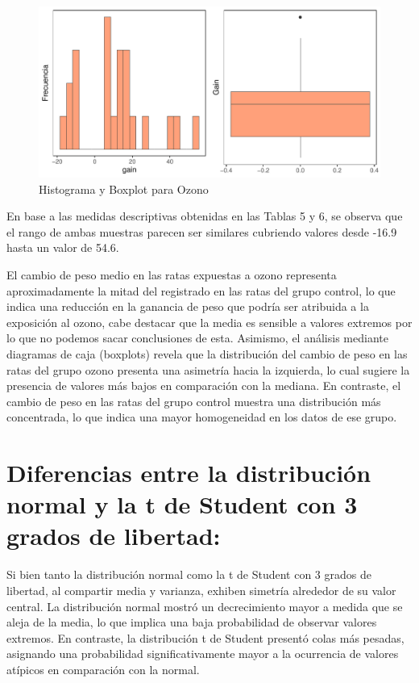 \documentclass[
]{article}
\begin{document}
\begin{figure}

{\centering \includegraphics{TP-2---El-Dibu-de-la-vida_files/figure-latex/f17-1} 

}

\caption{Histograma y Boxplot para Ozono}\label{fig:f17}
\end{figure}

En base a las medidas descriptivas obtenidas en las Tablas 5 y 6, se observa que el rango de ambas muestras parecen ser similares cubriendo valores desde -16.9 hasta un valor de 54.6.

El cambio de peso medio en las ratas expuestas a ozono representa aproximadamente la mitad del registrado en las ratas del grupo control, lo que indica una reducción en la ganancia de peso que podría ser atribuida a la exposición al ozono, cabe destacar que la media es sensible a valores extremos por lo que no podemos sacar conclusiones de esta. Asimismo, el análisis mediante diagramas de caja (boxplots) revela que la distribución del cambio de peso en las ratas del grupo ozono presenta una asimetría hacia la izquierda, lo cual sugiere la presencia de valores más bajos en comparación con la mediana. En contraste, el cambio de peso en las ratas del grupo control muestra una distribución más concentrada, lo que indica una mayor homogeneidad en los datos de ese grupo.

\newpage

\section{Diferencias entre la distribución normal y la t de Student con 3 grados de libertad:}\label{diferencias-entre-la-distribuciuxf3n-normal-y-la-t-de-student-con-3-grados-de-libertad}

Si bien tanto la distribución normal como la t de Student con 3 grados de libertad, al compartir media y varianza, exhiben simetría alrededor de su valor central. La distribución normal mostró un decrecimiento mayor a medida que se aleja de la media, lo que implica una baja probabilidad de observar valores extremos. En contraste, la distribución t de Student presentó colas más pesadas, asignando una probabilidad significativamente mayor a la ocurrencia de valores atípicos en comparación con la normal.
\end{document}
